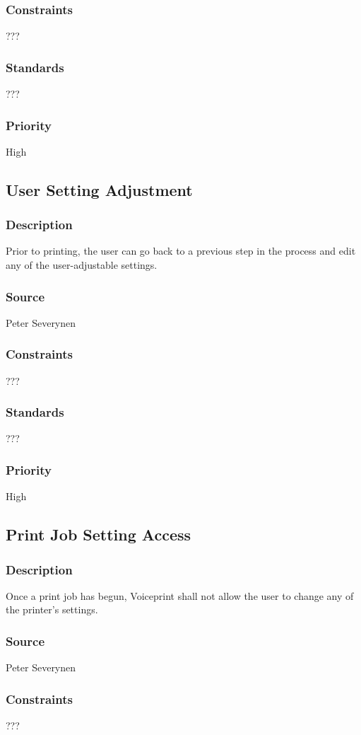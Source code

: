 \subsubsection{Constraints}
???
\subsubsection{Standards}
???
\subsubsection{Priority}
High
\subsection{User Setting Adjustment}
\subsubsection{Description}
Prior to printing, the user can go back to a previous step in the process and edit any of the user-adjustable settings.
\subsubsection{Source}
Peter Severynen
\subsubsection{Constraints}
???
\subsubsection{Standards}
???
\subsubsection{Priority}
High
\subsection{Print Job Setting Access}
\subsubsection{Description}
Once a print job has begun, Voiceprint shall not allow the user to change any of the printer's settings.
\subsubsection{Source}
Peter Severynen
\subsubsection{Constraints}
???
